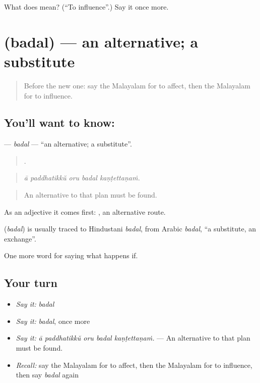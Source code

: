 \begin{tcolorbox}[breakable,colback=teal!4,colframe=teal!35!black,title={Before you move on}]
What does  mean? (\textquotedblleft{}To influence\textquotedblright{}.) Say it once more.
\end{tcolorbox}
\section[\texorpdfstring{\ml{ബദൽ} (badal)}{ബദൽ (badal)}]{ (badal) — an alternative; a substitute}

\label{lesson:ML-C443-badal}



\begin{quote}
Before the new one: say the Malayalam for to affect, then the Malayalam for to influence.
\end{quote}

\subsection*{You'll want to know: }
\textbf{} — \emph{badal} — \textquotedblleft{}an alternative; a substitute\textquotedblright{}.

\begin{quote}
    .
\end{quote}

\begin{quote}
\emph{ā paddhatikkŭ oru badal kaṇṭettaṇaṁ.}
\end{quote}

\begin{quote}
An alternative to that plan must be found.
\end{quote}

As an adjective it comes first:  , an alternative route.

\begin{cousinweb}
\textbf{} (\emph{badal}) is usually traced to Hindustani \emph{badal}, from Arabic \emph{badal}, \textquotedblleft{}a substitute, an exchange\textquotedblright{}.
\end{cousinweb}

\begin{grammarlens}[title={What you've built}]
One more word for saying what happens if.
\end{grammarlens}

\subsection*{Your turn}
\begin{itemize}
\raggedright
  \item \emph{Say it:} \emph{badal}
  \item \emph{Say it:} \emph{badal}, once more
  \item \emph{Say it:} \emph{ā paddhatikkŭ oru badal kaṇṭettaṇaṁ.} — An alternative to that plan must be found.
  \item \emph{Recall:} say the Malayalam for to affect, then the Malayalam for to influence, then say \emph{badal} again
\end{itemize}


